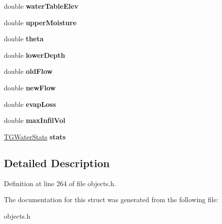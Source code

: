 \begin{DoxyCompactItemize}
\mbox{\label{struct_t_groundwater_a3325fd2fdddfac2519ea949bade4b0c7}} 
double {\bfseries water\+Table\+Elev}
\item 
\mbox{\label{struct_t_groundwater_adde7272ca55fb10e995c31af1708436f}} 
double {\bfseries upper\+Moisture}
\item 
\mbox{\label{struct_t_groundwater_aca81c35c21e3a5f7f3a8d24504e76664}} 
double {\bfseries theta}
\item 
\mbox{\label{struct_t_groundwater_a1e15c00614f8323611da29661f280210}} 
double {\bfseries lower\+Depth}
\item 
\mbox{\label{struct_t_groundwater_aa73f2501b3b1cbd10ed81ad704cdfe71}} 
double {\bfseries old\+Flow}
\item 
\mbox{\label{struct_t_groundwater_a013e2ce050bcc8727ce0e9cbc93dbc18}} 
double {\bfseries new\+Flow}
\item 
\mbox{\label{struct_t_groundwater_a3bd47dbb068d3930a0c69000be666399}} 
double {\bfseries evap\+Loss}
\item 
\mbox{\label{struct_t_groundwater_a51ddb974709ca399188a0f784e901c74}} 
double {\bfseries max\+Infil\+Vol}
\item 
\mbox{\label{struct_t_groundwater_abd0adacc7b97a104bdff0c9c1f029bc0}} 
\hyperlink{struct_t_g_water_stats}{T\+G\+Water\+Stats} {\bfseries stats}
\end{DoxyCompactItemize}


\subsection{Detailed Description}


Definition at line 264 of file objects.\+h.



The documentation for this struct was generated from the following file\+:\begin{DoxyCompactItemize}
\item 
objects.\+h\end{DoxyCompactItemize}
